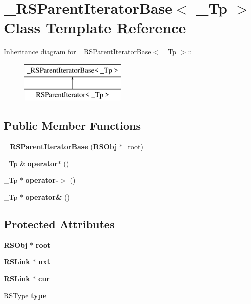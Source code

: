 \section{\_\-RSParentIteratorBase$<$ \_\-Tp $>$ Class Template Reference}
\label{class__RSParentIteratorBase}
Inheritance diagram for \_\-RSParentIteratorBase$<$ \_\-Tp $>$::\begin{figure}[H]
\begin{center}
\leavevmode
\includegraphics[height=2cm]{class__RSParentIteratorBase}
\end{center}
\end{figure}
\subsection*{Public Member Functions}
\begin{DoxyCompactItemize}
\item 
{\bfseries \_\-RSParentIteratorBase} ({\bf RSObj} $\ast$\_\-root)\label{class__RSParentIteratorBase_a8d94f20fa8429a0d2fb71cff51687af0}

\item 
\_\-Tp \& {\bfseries operator$\ast$} ()\label{class__RSParentIteratorBase_a1c2f4e14e17c6cbde822b8b5443340ff}

\item 
\_\-Tp $\ast$ {\bfseries operator-\/$>$} ()\label{class__RSParentIteratorBase_a6d9145b0e1e626999790890171a58cb4}

\item 
\_\-Tp $\ast$ {\bfseries operator\&} ()\label{class__RSParentIteratorBase_a1a1ca787bb7f8ba776ef0f23792c6485}

\end{DoxyCompactItemize}
\subsection*{Protected Attributes}
\begin{DoxyCompactItemize}
\item 
{\bf RSObj} $\ast$ {\bfseries root}\label{class__RSParentIteratorBase_ac1bd28e65d3b9777a9f16cdee00b7b6e}

\item 
{\bf RSLink} $\ast$ {\bfseries nxt}\label{class__RSParentIteratorBase_a71bbd4437d43e17760315c6178757bbc}

\item 
{\bf RSLink} $\ast$ {\bfseries cur}\label{class__RSParentIteratorBase_a20edc033cc73d5b7c5eb962fc32c78e5}

\item 
RSType {\bfseries type}\label{class__RSParentIteratorBase_a93a2da9e38fa9a9e8a207f131b3b6149}

\end{DoxyCompactItemize}


